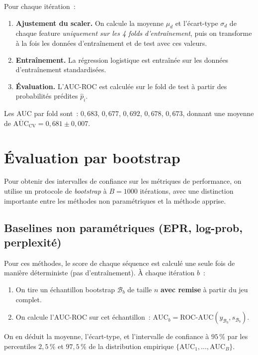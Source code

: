 \documentclass[11pt,a4paper]{article}
\begin{document}
Pour chaque itération~:
\begin{enumerate}
    \item \textbf{Ajustement du scaler.} On calcule la moyenne $\mu_d$ et l'écart-type $\sigma_d$ de chaque feature \emph{uniquement sur les 4 folds d'entraînement}, puis on transforme à la fois les données d'entraînement et de test avec ces valeurs.
    \item \textbf{Entraînement.} La régression logistique est entraînée sur les données d'entraînement standardisées.
    \item \textbf{Évaluation.} L'AUC-ROC est calculée sur le fold de test à partir des probabilités prédites $\hat{p}_i$.
\end{enumerate}
Les AUC par fold sont~: $0{,}683$, $0{,}677$, $0{,}692$, $0{,}678$, $0{,}673$, donnant une moyenne de $\overline{\text{AUC}}_{\text{CV}} = 0{,}681 \pm 0{,}007$.

\section{Évaluation par bootstrap}\label{sec:bootstrap}

Pour obtenir des intervalles de confiance sur les métriques de performance, on utilise un protocole de \emph{bootstrap} à $B = 1000$ itérations, avec une distinction importante entre les méthodes non paramétriques et la méthode apprise.

\subsection{Baselines non paramétriques (EPR, log-prob, perplexité)}

Pour ces méthodes, le score de chaque séquence est calculé une seule fois de manière déterministe (pas d'entraînement). À chaque itération $b$~:
\begin{enumerate}
    \item On tire un échantillon bootstrap $\mathcal{B}_b$ de taille $n$ \textbf{avec remise} à partir du jeu complet.
    \item On calcule l'AUC-ROC sur cet échantillon~: $\text{AUC}_b = \text{ROC-AUC}(y_{\mathcal{B}_b}, s_{\mathcal{B}_b})$.
\end{enumerate}
On en déduit la moyenne, l'écart-type, et l'intervalle de confiance à $95\,\%$ par les percentiles $2{,}5\,\%$ et $97{,}5\,\%$ de la distribution empirique $\{\text{AUC}_1, \dots, \text{AUC}_B\}$.
\end{document}
